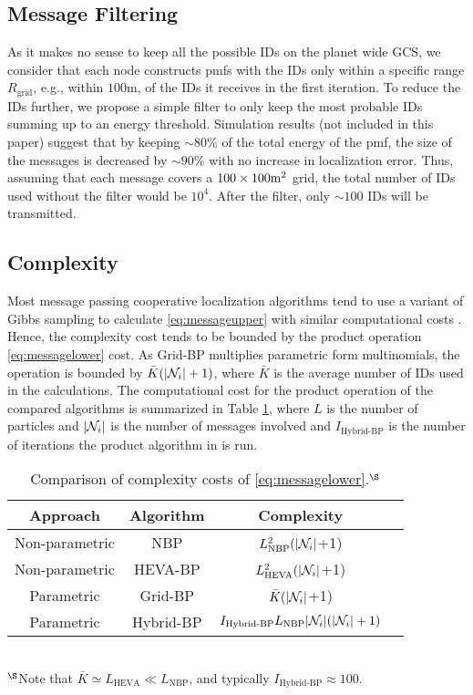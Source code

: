 \documentclass[10pt, final, journal]{IEEEtran}
\begin{document}
\subsection{Message Filtering}\label{messagefiltering}
As it makes no sense to keep all the possible IDs on the planet wide GCS, we consider that each node constructs pmfs with the IDs only within a specific range $ R_{\text{grid}}$, e.g., within $100$m, of the IDs it receives in the first iteration. To reduce the IDs further, we propose a simple filter to only keep the most probable IDs summing up to an energy threshold. Simulation results (not included in this paper) suggest that by keeping $\sim80\%$ of the total energy of the pmf, the size of the messages is decreased by $\sim 90\%$ with no increase in localization error. Thus, assuming that each message covers a $100 \times 100{\rm m}^2$ grid, the total number of IDs used without the filter would be $10^4$. After the filter, only $\sim100$ IDs will be transmitted.

\subsection{Complexity}\label{complexity}
Most message passing cooperative localization algorithms tend to use a variant of Gibbs sampling to calculate \eqref{eq:messageupper} with similar computational costs \cite{Lien:2012bh}. Hence, the complexity cost tends to be bounded by the product operation \eqref{eq:messagelower} cost. As Grid-BP multiplies parametric form multinomials, the operation is bounded by $\bar{K} (| {\cal{N}}_{i} |+1)$, where $\bar{K}$ is the average number of IDs used in the calculations. The computational cost for the product operation of the compared algorithms is summarized in Table \ref{table:productcomplexity}, where $L$ is the number of particles  and $| {\cal{N}}_{i} |$ is the number of messages involved and $I_{\text{Hybrid-BP}}$ is the number of iterations the product algorithm in \cite{Caceres:2011wx} is run.

\begin{table}[H]
\caption{Comparison of complexity costs of \eqref{eq:messagelower}.$^\S$}
\center
\label{table:productcomplexity}

\begin{tabular}{c|c|c|c}
Approach & Algorithm & Complexity\\
\hline
Non-parametric & NBP  & $L_{\text{NBP}}^2(| {\cal{N}}_{i} |$+1)\\
Non-parametric & HEVA-BP  & $L_{\text{HEVA}}^2(| {\cal{N}}_{i} |$+1)\\
Parametric & Grid-BP  & $\bar{K}(| {\cal{N}}_{i} |$+1)\\
Parametric & Hybrid-BP  & $I_{\text{Hybrid-BP}} L_{\text{NBP}}| {\cal{N}}_{i} |(| {\cal{N}}_{i} |+1)$\\
\end{tabular}\\
$^\S$Note that $\bar{K}\simeq L_{\text{HEVA}}\ll L_{\text{NBP}}$, and typically $I_{\text{Hybrid-BP}}\approx 100$.
\end{table}
\end{document}
